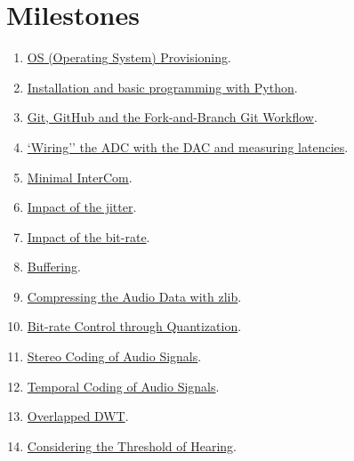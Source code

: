 \section{Milestones}
\begin{enumerate}
\item \href{https://tecnologias-multimedia.github.io/study_guide/01-provisioning/}{OS (Operating System) Provisioning}.
\item \href{https://tecnologias-multimedia.github.io/study_guide/02-python/}{Installation and basic programming with Python}.
\item \href{https://tecnologias-multimedia.github.io/study_guide/03-git/}{Git, GitHub and the Fork-and-Branch Git Workflow}.
\item \href{https://tecnologias-multimedia.github.io/study_guide/04-wiring/}{`Wiring'' the ADC with the DAC and measuring latencies}.
\item \href{https://tecnologias-multimedia.github.io/study_guide/05-minimal/}{Minimal InterCom}.
\item \href{https://tecnologias-multimedia.github.io/study_guide/06-jitter_impact/}{Impact of the jitter}.
\item \href{https://tecnologias-multimedia.github.io/study_guide/07-bit-rate_impact/}{Impact of the bit-rate}.
\item \href{https://tecnologias-multimedia.github.io/study_guide/08-buffer/}{Buffering}.
\item \href{https://tecnologias-multimedia.github.io/study_guide/09-compress/}{Compressing the Audio Data with zlib}.
\item \href{https://tecnologias-multimedia.github.io/study_guide/10-br_control/}{Bit-rate Control through Quantization}.
\item \href{https://tecnologias-multimedia.github.io/study_guide/11-stereo_coding/}{Stereo Coding of Audio Signals}.
\item \href{https://tecnologias-multimedia.github.io/study_guide/12-temporal_coding/}{Temporal Coding of Audio Signals}.
\item \href{https://tecnologias-multimedia.github.io/study_guide/13-overlapped_temporal_coding/}{Overlapped DWT}.
\item \href{https://tecnologias-multimedia.github.io/study_guide/14-threshold_of_hearing/}{Considering the Threshold of Hearing}.
\end{enumerate}


